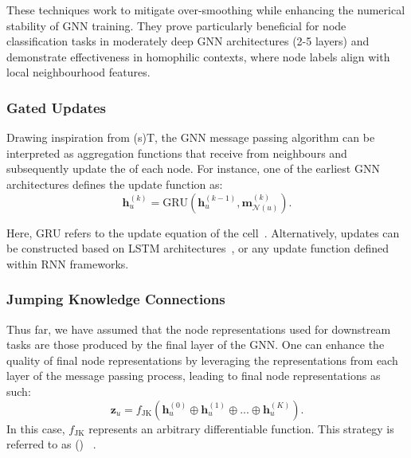 \medskip
These techniques work to mitigate over-smoothing while enhancing the numerical stability of GNN training. They prove particularly beneficial for node classification tasks in moderately deep GNN architectures (2-5 layers) and demonstrate effectiveness in homophilic contexts, where node labels align with local neighbourhood features.

\subsubsection{Gated Updates}
Drawing inspiration from  (s)T, the GNN message passing algorithm can be interpreted as aggregation functions that receive  from neighbours and subsequently update the  of each node. For instance, one of the earliest GNN architectures defines the update function as:
\begin{equation*}
    \mathbf{h}_u^{(k)} = \text{GRU}(\mathbf{h}_u^{(k-1)}, \mathbf{m}_{\mathcal{N}(u)}^{(k)}).
\end{equation*}

Here, GRU refers to the update equation of the  cell~\cite{Cho2014learningPhraseRepresentations}. Alternatively, updates can be constructed based on LSTM architectures~\cite{selsam2018LearningSATSolverSingleBitSupervision}, or any update function defined within RNN frameworks.

\subsubsection{Jumping Knowledge Connections}
Thus far, we have assumed that the node representations used for downstream tasks are those produced by the final layer of the GNN.  One can enhance the quality of final node representations by leveraging the representations from each layer of the message passing process, leading to final node representations as such:
\begin{equation*}
    \mathbf{z}_u = f_\text{JK}(\mathbf{h}_u^{(0)} \oplus \mathbf{h}_u^{(1)} \oplus ... \oplus \mathbf{h}_u^{(K)}).
\end{equation*}
In this case, $ f_\text{JK} $ represents an arbitrary differentiable function. This strategy is referred to as  () ~\cite{xu2018RepresentationLearningGraphsJumpingKnowledgeNetworks}.

